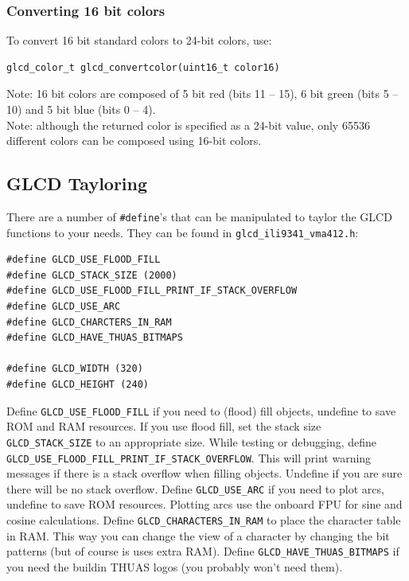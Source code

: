 \documentclass[12pt]{article}
\newcommand{\ifunc}[1]{\index{\texttt{#1}}}
\begin{document}
\subsubsection{Converting 16 bit colors}
\ifunc{glcd\_convertcolor}
\label{sec:convertcolors}
To convert 16 bit standard colors to 24-bit colors, use:

\begin{lstlisting}
glcd_color_t glcd_convertcolor(uint16_t color16)
\end{lstlisting}

Note: 16 bit colors are composed of 5 bit red (bits 11 -- 15), 6 bit green (bits 5 -- 10) and 5 bit blue (bits 0 -- 4).\\
Note: although the returned color is specified as a 24-bit value, only 65536 different colors can be composed using 16-bit colors.

\subsection{GLCD Tayloring}
There are a number of \lstinline|#define|'s that can be manipulated to taylor the GLCD functions to your needs. They can be found in \lstinline|glcd_ili9341_vma412.h|:

\begin{lstlisting}
#define GLCD_USE_FLOOD_FILL
#define GLCD_STACK_SIZE (2000)
#define GLCD_USE_FLOOD_FILL_PRINT_IF_STACK_OVERFLOW
#define GLCD_USE_ARC
#define GLCD_CHARCTERS_IN_RAM
#define GLCD_HAVE_THUAS_BITMAPS

#define GLCD_WIDTH (320)
#define GLCD_HEIGHT (240)
\end{lstlisting}

Define \lstinline|GLCD_USE_FLOOD_FILL| if you need to (flood) fill objects, undefine to save ROM  and RAM resources. If you use flood fill, set the stack size \lstinline|GLCD_STACK_SIZE| to an appropriate size. While testing or debugging, define \lstinline|GLCD_USE_FLOOD_FILL_PRINT_IF_STACK_OVERFLOW|. This will print warning messages if there is a stack overflow when filling objects. Undefine if you are sure there will be no stack overflow. Define \lstinline|GLCD_USE_ARC| if you need to plot arcs, undefine to save ROM resources. Plotting arcs use the onboard FPU for sine and cosine calculations. Define \lstinline|GLCD_CHARACTERS_IN_RAM| to place the character table in RAM. This way you can change the view of a character by changing the bit patterns (but of course is uses extra RAM). Define \lstinline|GLCD_HAVE_THUAS_BITMAPS| if you need the buildin THUAS logos (you probably won't need them).
\end{document}
